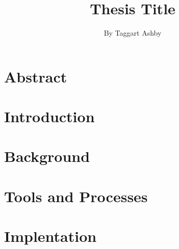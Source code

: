 \documentclass[11pt]{article}
\begin{document}

\title{\vfill Thesis Title} %
\author{
By Taggart Ashby \vspace{10pt} \\
}

\maketitle

\vfill  %
\thispagestyle{empty} %
\newpage


\begin{multicols}{2}
\setcounter{page}{1}


\section{Abstract}




\section{Introduction}



\section{Background}




\section{Tools and Processes}



\section{Implentation}




\end{multicols}
\end{document}
